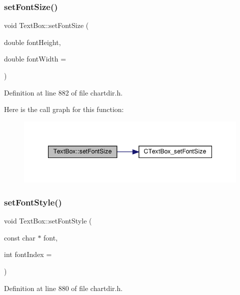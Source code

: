\subsubsection{\texorpdfstring{set\+Font\+Size()}{setFontSize()}}
{\footnotesize\ttfamily void Text\+Box\+::set\+Font\+Size (\begin{DoxyParamCaption}\item[{double}]{font\+Height,  }\item[{double}]{font\+Width = {} }\end{DoxyParamCaption})\hspace{0.3cm}{\ttfamily [inline]}}



Definition at line 882 of file chartdir.\+h.

Here is the call graph for this function\+:
\nopagebreak
\begin{figure}[H]
\begin{center}
\leavevmode
\includegraphics[width=347pt]{class_text_box_ac0f1e542059007afdbc987f9799afa59_cgraph}
\end{center}
\end{figure}
\mbox{\label{class_text_box_a5df18fab11787fa81049cd11dbfe4e8e}} 
\subsubsection{\texorpdfstring{set\+Font\+Style()}{setFontStyle()}}
{\footnotesize\ttfamily void Text\+Box\+::set\+Font\+Style (\begin{DoxyParamCaption}\item[{const char $\ast$}]{font,  }\item[{int}]{font\+Index = {} }\end{DoxyParamCaption})\hspace{0.3cm}{\ttfamily [inline]}}



Definition at line 880 of file chartdir.\+h.

